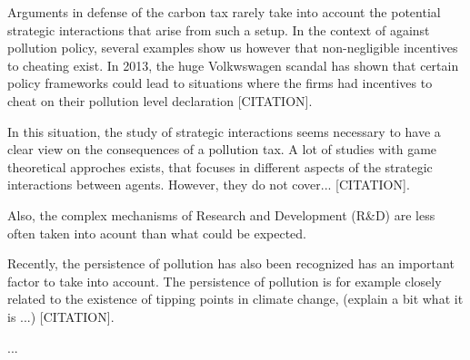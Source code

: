 \documentclass{article}
\begin{document}
Arguments in defense of the carbon tax rarely take into account the potential strategic interactions that arise from such a setup.
In the context of against pollution policy, several examples show us however that non-negligible incentives to cheating exist. 
In 2013, the huge Volkwswagen scandal has shown that certain policy frameworks could lead to situations where the firms had incentives to cheat on their pollution level declaration [CITATION]. 

In this situation, the study of strategic interactions seems necessary to have a clear view on the consequences of a pollution tax. 
A lot of studies with game theoretical approches exists, that focuses in different aspects of the strategic interactions between agents.
However, they do not cover... [CITATION].

Also, the complex mechanisms of Research and Development (R\&D) are less often taken into acount than what could be expected. 

Recently, the persistence of pollution has also been recognized has an important factor to take into account.
The persistence of pollution is for example closely related to the existence of tipping points in climate change, (explain a bit what it is ...) [CITATION].

...



\end{document}
